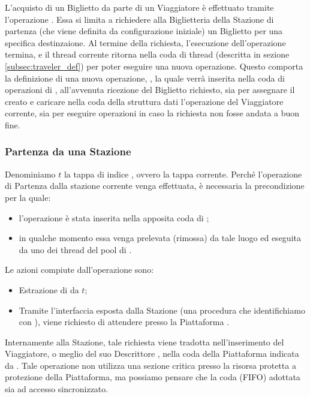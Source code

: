 	L'acquisto di un Biglietto da parte di un Viaggiatore è effettuato tramite l'operazione . Essa si limita a richiedere alla Biglietteria della Stazione di partenza (che viene definita da configurazione iniziale) un Biglietto per una specifica destinzaione. Al termine della richiesta, l'esecuzione dell'operazione termina, e il thread corrente ritorna nella coda di thread  (descritta in sezione \ref{subsec:traveler_def}) per poter eseguire una nuova operazione. Questo comporta la definizione di una nuova operazione, , la quale verrà inserita nella coda di operazioni di , all'avvenuta ricezione del Biglietto richiesto, sia per assegnare il  creato e caricare nella coda della struttura dati  l'operazione  del Viaggiatore corrente, sia per eseguire operazioni in caso la richiesta non fosse andata a buon fine.
	
	\subsubsection{Partenza da una Stazione}
	
	Denominiamo $t$ la tappa di indice , ovvero la tappa corrente. Perché l'operazione di Partenza dalla stazione corrente venga effettuata, è necessaria la precondizione per la quale:
	\begin{itemize}
		\item l'operazione  è stata inserita nella apposita coda di ;
		\item in qualche momento essa venga prelevata (rimossa) da tale luogo ed eseguita da uno dei thread del pool di . 
	\end{itemize}
Le azioni compiute dall'operazione  sono:
	
	\begin{itemize}
		\item Estrazione di  da $t$;
		\item Tramite l'interfaccia esposta dalla Stazione  (una procedura che identifichiamo con ), viene richiesto di attendere presso la Piattaforma .
	\end{itemize} 
	
	Internamente alla Stazione, tale richiesta viene tradotta nell'inserimento del Viaggiatore, o meglio del suo Descrittore , nella coda  della Piattaforma indicata da . Tale operazione non utilizza una sezione critica presso la risorsa protetta a protezione della Piattaforma, ma possiamo pensare che la coda (FIFO) adottata sia ad accesso sincronizzato.
	
